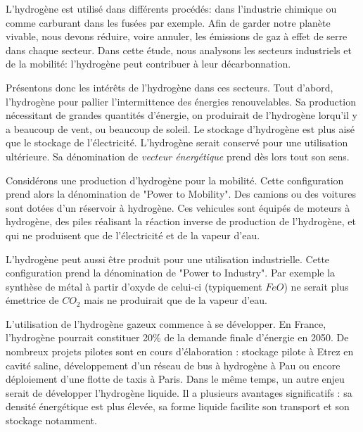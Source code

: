 \documentclass[11pt,french,a4paper]{article}
\begin{document}
L'hydrogène est utilisé dans différents procédés: dans l'industrie chimique ou comme carburant dans les fusées par exemple. Afin de garder notre planète vivable, nous devons réduire, voire annuler, les émissions de gaz à effet de serre dans chaque secteur. Dans cette étude, nous analysons les secteurs industriels et de la mobilité: l'hydrogène peut contribuer à leur décarbonnation.

Présentons donc les intérêts de l'hydrogène dans ces secteurs. Tout d'abord, l'hydrogène pour pallier l'intermittence des énergies renouvelables. Sa production nécessitant de grandes quantités d'énergie, on produirait de l'hydrogène lorqu'il y a beaucoup de vent, ou beaucoup de soleil. Le stockage d'hydrogène est plus aisé que le stockage de l'électricité. L'hydrogène serait conservé pour une utilisation ultérieure. Sa dénomination de \emph{vecteur énergétique} prend dès lors tout son sens.

 Considérons une production d'hydrogène pour la mobilité. Cette configuration prend alors la dénomination de "Power to Mobility". Des camions ou des voitures sont dotées d'un réservoir à hydrogène. Ces vehicules sont équipés de moteurs à hydrogène, des piles réalisant la réaction inverse de production de l'hydrogène, et qui ne produisent que de l'électricité et de la vapeur d'eau. 
 
 L'hydrogène peut aussi être produit pour une utilisation industrielle. Cette configuration prend la dénomination de "Power to Industry". Par exemple la synthèse de métal à partir d'oxyde de celui-ci (typiquement $FeO$) ne serait plus émettrice de $CO_2$ mais ne produirait que de la vapeur d'eau.
 
L’utilisation de l’hydrogène gazeux commence à se développer. En France, l’hydrogène pourrait constituer 20\% de la demande finale d’énergie en 2050. De nombreux projets pilotes sont en cours d’élaboration : stockage pilote à Etrez en cavité saline, développement d’un réseau de bus à hydrogène à Pau ou encore déploiement d’une flotte de taxis à Paris. Dans le même temps, un autre enjeu serait de développer l’hydrogène liquide. Il a plusieurs avantages significatifs : sa densité énergétique est plus élevée, sa forme liquide facilite son transport et son stockage notamment.
\end{document}
